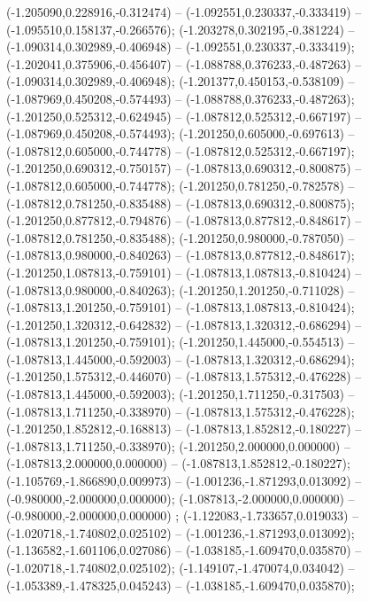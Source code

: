  (-1.205090,0.228916,-0.312474) -- (-1.092551,0.230337,-0.333419) -- (-1.095510,0.158137,-0.266576);
 (-1.203278,0.302195,-0.381224) -- (-1.090314,0.302989,-0.406948) -- (-1.092551,0.230337,-0.333419);
 (-1.202041,0.375906,-0.456407) -- (-1.088788,0.376233,-0.487263) -- (-1.090314,0.302989,-0.406948);
 (-1.201377,0.450153,-0.538109) -- (-1.087969,0.450208,-0.574493) -- (-1.088788,0.376233,-0.487263);
 (-1.201250,0.525312,-0.624945) -- (-1.087812,0.525312,-0.667197) -- (-1.087969,0.450208,-0.574493);
 (-1.201250,0.605000,-0.697613) -- (-1.087812,0.605000,-0.744778) -- (-1.087812,0.525312,-0.667197);
 (-1.201250,0.690312,-0.750157) -- (-1.087813,0.690312,-0.800875) -- (-1.087812,0.605000,-0.744778);
 (-1.201250,0.781250,-0.782578) -- (-1.087812,0.781250,-0.835488) -- (-1.087813,0.690312,-0.800875);
 (-1.201250,0.877812,-0.794876) -- (-1.087813,0.877812,-0.848617) -- (-1.087812,0.781250,-0.835488);
 (-1.201250,0.980000,-0.787050) -- (-1.087813,0.980000,-0.840263) -- (-1.087813,0.877812,-0.848617);
 (-1.201250,1.087813,-0.759101) -- (-1.087813,1.087813,-0.810424) -- (-1.087813,0.980000,-0.840263);
 (-1.201250,1.201250,-0.711028) -- (-1.087813,1.201250,-0.759101) -- (-1.087813,1.087813,-0.810424);
 (-1.201250,1.320312,-0.642832) -- (-1.087813,1.320312,-0.686294) -- (-1.087813,1.201250,-0.759101);
 (-1.201250,1.445000,-0.554513) -- (-1.087813,1.445000,-0.592003) -- (-1.087813,1.320312,-0.686294);
 (-1.201250,1.575312,-0.446070) -- (-1.087813,1.575312,-0.476228) -- (-1.087813,1.445000,-0.592003);
 (-1.201250,1.711250,-0.317503) -- (-1.087813,1.711250,-0.338970) -- (-1.087813,1.575312,-0.476228);
 (-1.201250,1.852812,-0.168813) -- (-1.087813,1.852812,-0.180227) -- (-1.087813,1.711250,-0.338970);
 (-1.201250,2.000000,0.000000) -- (-1.087813,2.000000,0.000000) -- (-1.087813,1.852812,-0.180227);
 (-1.105769,-1.866890,0.009973) -- (-1.001236,-1.871293,0.013092) -- (-0.980000,-2.000000,0.000000);
 (-1.087813,-2.000000,0.000000) -- (-0.980000,-2.000000,0.000000) ;
 (-1.122083,-1.733657,0.019033) -- (-1.020718,-1.740802,0.025102) -- (-1.001236,-1.871293,0.013092);
 (-1.136582,-1.601106,0.027086) -- (-1.038185,-1.609470,0.035870) -- (-1.020718,-1.740802,0.025102);
 (-1.149107,-1.470074,0.034042) -- (-1.053389,-1.478325,0.045243) -- (-1.038185,-1.609470,0.035870);
